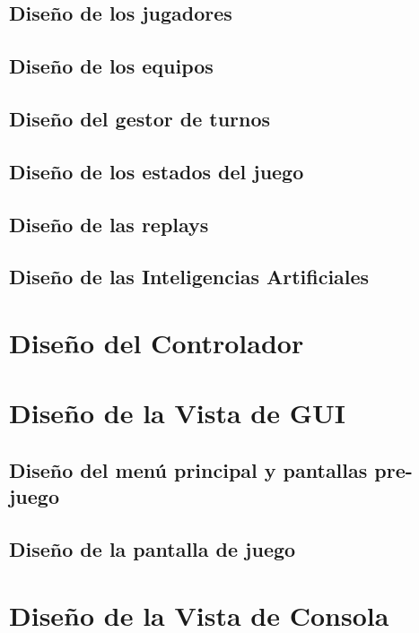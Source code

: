 \documentclass{article}
\begin{document}
\subsection{Diseño de los jugadores}

\subsection{Diseño de los equipos}

\subsection{Diseño del gestor de turnos}

\subsection{Diseño de los estados del juego}

\subsection{Diseño de las replays}

\subsection{Diseño de las Inteligencias Artificiales}


\section{Diseño del Controlador}


\section{Diseño de la Vista de GUI}

\subsection{Diseño del menú principal y pantallas pre-juego}

\subsection{Diseño de la pantalla de juego}


\section{Diseño de la Vista de Consola}
\end{document}
